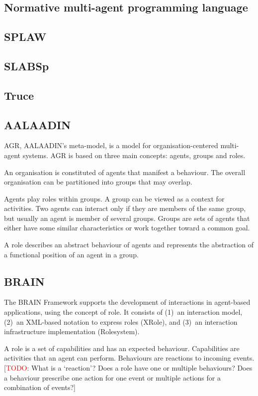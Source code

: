 \documentclass{article}
\newcommand{\todo}[1]{[\textcolor{red}{TODO}: #1]}
\begin{document}
\subsection{Normative multi-agent programming language}
\subsection{SPLAW}
\subsection{SLABSp}
\subsection{Truce}

\subsection{AALAADIN} 
\label{sec:aalaadin}

AGR, AALAADIN's meta-model, is a model for organisation-centered
multi-agent systems. AGR is based on three main concepts: agents,
groups and roles.

An organisation is constituted of agents that manifest a behaviour.
The overall organisation can be partitioned into groups that may
overlap. 

Agents play roles within groups. A group can be viewed as a
context for activities. Two agents can interact only if they are
members of the same group, but usually an agent is member of
several groups. Groups are sets of agents that either have some
similar characteristics or work together toward a common goal.

A role describes an abstract behaviour of agents and represents the
abstraction of a functional position of an agent in a group.

\subsection{BRAIN} 

The BRAIN Framework supports the development of interactions
in agent-based applications, using the concept of role. It
consists of (1)~an interaction model, (2)~an XML-based notation
to express roles (XRole), and (3)~an interaction infrastructure
implementation (Rolesystem).

A role is a set of capabilities and has an expected behaviour.
Capabilities are activities that an agent can perform. Behaviours
are reactions to incoming events. \todo{What is a `reaction'?
Does a role have one or multiple behaviours? Does a behaviour
prescribe one action for one event or multiple actions for a
combination of events?}
\end{document}
